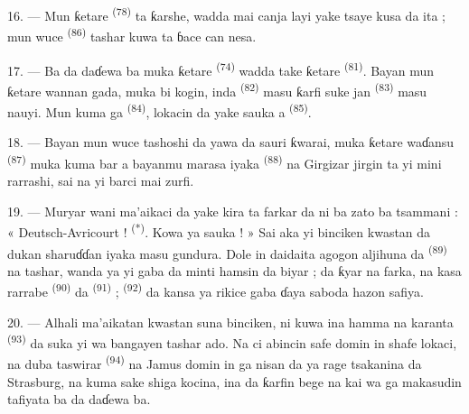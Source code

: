 16. --- Mun ƙetare  \textsuperscript{(78)} ta
ƙarshe, wadda mai canja layi yake tsaye kusa da ita ; mun wuce
 \textsuperscript{(86)} tashar kuwa ta ɓace can nesa.

17. --- Ba da daɗewa ba muka ƙetare 
\textsuperscript{(74)} wadda take ƙetare 
\textsuperscript{(81)}. Bayan mun ƙetare wannan gada, muka bi kogin, inda
 \textsuperscript{(82)} masu ƙarfi suke jan
 \textsuperscript{(83)} masu nauyi. Mun kuma ga
 \textsuperscript{(84)}, lokacin da yake sauka a
 \textsuperscript{(85)}.

18. --- Bayan mun wuce tashoshi da yawa da sauri ƙwarai, muka ƙetare
waɗansu  \textsuperscript{(87)} muka kuma bar a bayanmu
 marasa iyaka \textsuperscript{(88)} na  Girgizar jirgin ta yi mini rarrashi, sai na yi barci mai
zurfi.

\VUsaut{3.0mm}
\VUsaut{3.0mm}

19. --- Muryar wani ma’aikaci da yake kira ta farkar da ni ba zato ba
tsammani : « Deutsch-Avricourt ! \textsuperscript{(*)}. Kowa ya sauka ! »
Sai aka yi binciken kwastan da dukan sharuɗɗan iyaka masu gundura.
Dole in daidaita agogon aljihuna da 
\textsuperscript{(89)} na tashar, wanda ya yi gaba da minti hamsin da
biyar ; da ƙyar na farka, na kasa rarrabe 
\textsuperscript{(90)} da  \textsuperscript{(91)} ;
 \textsuperscript{(92)} da kansa ya rikice gaba ɗaya
saboda hazon safiya.

20. --- Alhali ma’aikatan kwastan suna binciken, ni kuwa ina hamma na
karanta  \textsuperscript{(93)} da suka yi wa
bangayen tashar ado. Na ci abincin safe domin in shafe lokaci, na duba
taswirar  \textsuperscript{(94)} na Jamus domin
in ga nisan da ya rage tsakanina da Strasburg, na kuma sake shiga
kocina, ina da ƙarfin bege na kai wa ga makasudin tafiyata ba da daɗewa
ba.

\VUsaut{6.0mm}
\VUfilet{22mm}
